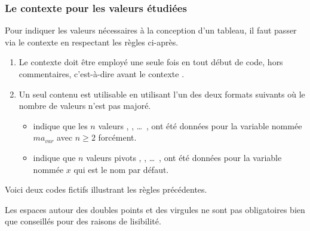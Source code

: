 \documentclass[12pt, a4paper]{article}
\begin{document}

\subsubsection{Le contexte  pour les valeurs étudiées}
\label{tns-math-functab-dsl-l3-ctxt-xvals}

Pour indiquer les valeurs nécessaires à la conception d'un tableau, il faut passer via le contexte  en respectant les règles ci-après.
%
\begin{enumerate}
    \item Le contexte  doit être employé une seule fois en tout début de code, hors commentaires, c'est-à-dire avant le contexte .


    \item Un seul contenu est utilisable en utilisant l'un des deux formats suivants où le nombre de valeurs n'est pas majoré.
    \begin{itemize}
        \item {} indique que les $n$ valeurs  ,  , \dots\ ,  ont été données pour la variable nommée $ma_{var}$ avec $n \geq 2$ forcément.

        \item {} indique que $n$ valeurs pivots  ,  , \dots\ ,  ont été données pour la variable nommée $x$ qui est le nom par défaut.
    \end{itemize}
\end{enumerate}


\medskip


Voici deux codes fictifs illustrant les règles précédentes.
\begin{multicols}{2}

\end{multicols}




\begin{tdocnote}
    Les espaces autour des doubles points et des virgules ne sont pas obligatoires bien que conseillés pour des raisons de lisibilité.
\end{tdocnote}
\end{document}
